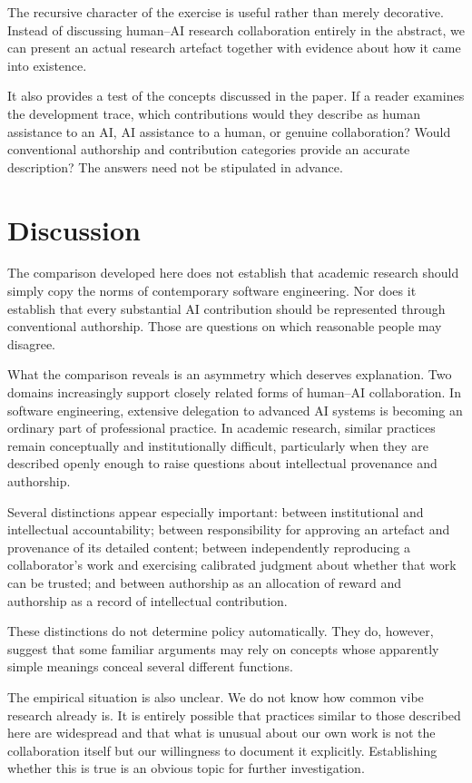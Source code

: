 The recursive character of the exercise is useful rather than merely decorative. Instead of discussing human--AI research collaboration entirely in the abstract, we can present an actual research artefact together with evidence about how it came into existence.

It also provides a test of the concepts discussed in the paper. If a reader examines the development trace, which contributions would they describe as human assistance to an AI, AI assistance to a human, or genuine collaboration? Would conventional authorship and contribution categories provide an accurate description? The answers need not be stipulated in advance.


\section{Discussion}

The comparison developed here does not establish that academic research should simply copy the norms of contemporary software engineering. Nor does it establish that every substantial AI contribution should be represented through conventional authorship. Those are questions on which reasonable people may disagree.

What the comparison reveals is an asymmetry which deserves explanation. Two domains increasingly support closely related forms of human--AI collaboration. In software engineering, extensive delegation to advanced AI systems is becoming an ordinary part of professional practice. In academic research, similar practices remain conceptually and institutionally difficult, particularly when they are described openly enough to raise questions about intellectual provenance and authorship.

Several distinctions appear especially important: between institutional and intellectual accountability; between responsibility for approving an artefact and provenance of its detailed content; between independently reproducing a collaborator's work and exercising calibrated judgment about whether that work can be trusted; and between authorship as an allocation of reward and authorship as a record of intellectual contribution.

These distinctions do not determine policy automatically. They do, however, suggest that some familiar arguments may rely on concepts whose apparently simple meanings conceal several different functions.

The empirical situation is also unclear. We do not know how common vibe research already is. It is entirely possible that practices similar to those described here are widespread and that what is unusual about our own work is not the collaboration itself but our willingness to document it explicitly. Establishing whether this is true is an obvious topic for further investigation.


